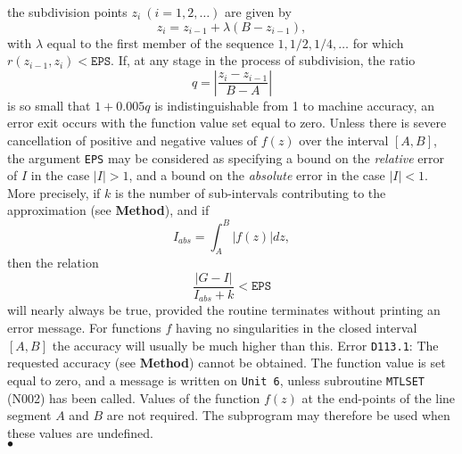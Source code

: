 the subdivision points $ z_i \ (i=1,2,\ldots) $ are given by
$$ z_i = z_{i-1} + \lambda (B-z_{i-1}), $$
with $\lambda$ equal to the first member of the sequence
$1,1/2,1/4,\ldots $ for which $r(z_{i-1},z_i) < \mathtt{EPS} $.
If, at any stage in the process of subdivision, the ratio
  $$ q=\left|\frac{z_i-z_{i-1}}{B-A}\right| $$
is so small that $1+0.005q$ is indistinguishable from 1 to
machine accuracy, an error exit occurs with the function value
set equal to zero.
\Accuracy
Unless there is severe cancellation of positive and negative
values of $f(z)$ over the interval $[A,B]$, the argument {\tt EPS}
may be considered as specifying a bound on the {\it relative} error of
$I$ in the case $|I| > 1$, and a bound on the {\it absolute} error in
the case $|I|<1$. More precisely, if $k$ is the number of sub-intervals
contributing to the approximation (see {\bf Method}), and if
$$ I_{abs} = \int^B_A|f(z)|dz,$$
then the relation
$$ \frac{|G - I|}{I_{abs}+k}< \mathtt{EPS} $$
will nearly always be true, provided the routine terminates
without printing an error message. For functions
$f$ having no singularities in the closed interval $[A,B]$
the accuracy will usually be much higher than this.
\Errorh
Error {\tt D113.1}: The requested accuracy (see {\bf Method})
cannot be obtained.
The function value is set equal to zero, and a message is written on
{\tt Unit 6}, unless subroutine {\tt MTLSET} (N002) has been called.
\Notes
Values of the function $f(z)$ at the  end-points of the line segment
$A$ and $B$ are not required. The subprogram may therefore
be used when these values are undefined.
\\ $\bullet$
